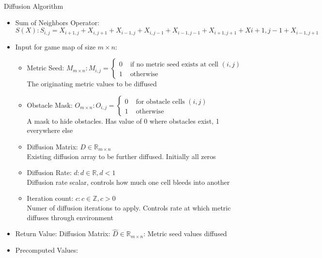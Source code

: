 \documentclass{beamer}
\begin{document}
\begin{frame}{Diffusion Algorithm}\fontsize{6pt}{7}\selectfont
  
  \begin{itemize}\fontsize{6pt}{7}\selectfont
  \item Sum of Neighbors Operator: \\$ S(X): S_{i,j} = X_{i+1,j} + X_{i,j+1} + X_{i-1,j} + X_{i,j-1} + X_{i-1,j-1} + X_{i+1,j+1} + X{i+1,j-1} + X_{i-1,j+1}$
  \item Input for game map of size $m \times n$:
    \begin{itemize}\fontsize{6pt}{7}\selectfont
    \item Metric Seed: $M_{m \times n}: M_{i,j} = \left\{ \begin{array}{rl}
          0 &\mbox{ if no metric seed exists at cell }(i,j) \\
          1 &\mbox{ otherwise}
        \end{array} \right.$ \\ The originating metric values to be diffused
    \item Obstacle Mask: $O_{m \times n}: O_{i,j} = \left\{ \begin{array}{rl}
          0 &\mbox{ for obstacle cells }(i,j) \\
          1 &\mbox{ otherwise}
        \end{array} \right.$ \\ A mask to hide obstacles.  Has value of 0 where obstacles exist, 1 everywhere else
    \item Diffusion Matrix: $D\in \mathbb{R}_{m \times n}$ \\ Existing diffusion array to be further diffused.  Initially all zeros
    \item Diffusion Rate: $d: d \in \mathbb{R},  d < 1$ \\ Diffusion rate scalar, controls how much one cell bleeds into another
    \item Iteration count: $c: c \in \mathbb{Z}, c > 0$ \\ Numer of diffusion iterations to apply.  Controls rate at which metric diffuses through environment
    \end{itemize}
  \item Return Value: Diffusion Matrix: $\hat D \in \mathbb{R}_{m \times n}$: Metric seed values diffused
  \item Precomputed Values:
\end{itemize}
\end{frame}
\end{document}
